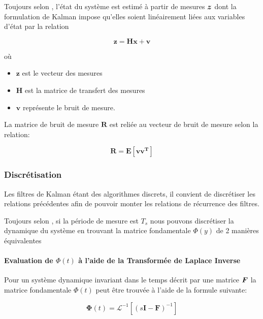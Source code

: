 \documentclass[12pt,a4paper]{report}
\begin{document}
	\para Toujours selon \cite{zarchan_fundamentals_2009}, l'état du système est estimé à partir de mesures $\boldsymbol{z}$ dont la formulation de Kalman impose qu'elles soient linéairement liées aux variables d'état par la relation 

	\begin{equation}
		\label{eq:mesure_cont}
		\boldsymbol{z=Hx + v}
	\end{equation}

	où

	\begin{itemize}
		\item
		\(\boldsymbol{z}\) est le vecteur des mesures
		\item
		\(\boldsymbol{H}\) est la matrice de transfert des mesures
		\item
		\(\boldsymbol{v}\) représente le bruit de mesure.
	\end{itemize}

	La matrice de bruit de mesure \(\boldsymbol{R}\) est reliée au vecteur	de bruit de mesure selon la relation:

	\begin{equation}
		\label{eq:covmesur_cont}
		\boldsymbol{R = E[vv^T]}
	\end{equation}
	
	\subsubsection{Discrétisation}
	Les filtres de Kalman étant des algorithmes discrets, il convient de discrétiser les relations précédentes afin de pouvoir monter les relations de récurrence des filtres.
	
	\para Toujours selon \cite{zarchan_fundamentals_2009}, si la période de mesure est $T_s$ nous pouvons discrétiser la dynamique du système en trouvant la matrice fondamentale $\Phi(y)$ de 2 manières équivalentes
	
	\paragraph*{Evaluation de $\Phi(t)$ à l'aide de la Transformée de Laplace Inverse}
	
	\para Pour un système dynamique invariant dans le temps décrit par une matrice $\boldsymbol{F}$ la matrice fondamentale $\Phi(t)$ peut être trouvée à l'aide de la formule suivante:
	
	\begin{equation}
	\boldsymbol \Phi(t) =  \mathcal{L}^{-1}[(s\boldsymbol{I-F})^{-1}]
	\end{equation}
	
\end{document}
